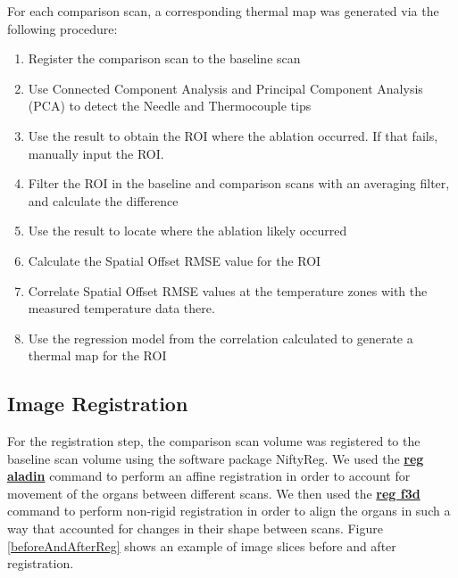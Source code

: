 \documentclass[]{spie}  %
\begin{document}
For each comparison scan, a corresponding thermal map was generated via the following procedure:
\begin{enumerate}
\item Register the comparison scan to the baseline scan
\item Use Connected Component Analysis and Principal Component Analysis (PCA) to detect the Needle and Thermocouple tips
\item Use the result to obtain the ROI where the ablation occurred. If that fails, manually input the ROI.
\item Filter the ROI in the baseline and comparison scans with an averaging filter, and calculate the difference
\item Use the result to locate where the ablation likely occurred
\item Calculate the Spatial Offset RMSE value for the ROI
\item Correlate Spatial Offset RMSE values at the temperature zones with the measured temperature data there. 
\item Use the regression model from the correlation calculated to generate a thermal map for the ROI
\end{enumerate}


\subsection{Image Registration}

For the registration step, the comparison scan volume was registered to the baseline scan volume using the software package NiftyReg. We used the \textbf{\href{http://cmictig.cs.ucl.ac.uk/wiki/index.php/Reg_aladin}{reg aladin}} command to perform an affine registration\cite{Ourselin01} in order to account for movement of the organs between different scans. We then used the \textbf{\href{http://cmictig.cs.ucl.ac.uk/wiki/index.php/Reg_f3d}{reg f3d}} command to perform non-rigid registration\cite{Modat10} in order to align the organs in such a way that accounted for changes in their shape between scans. Figure \ref{beforeAndAfterReg} shows an example of image slices before and after registration. 
\end{document}
